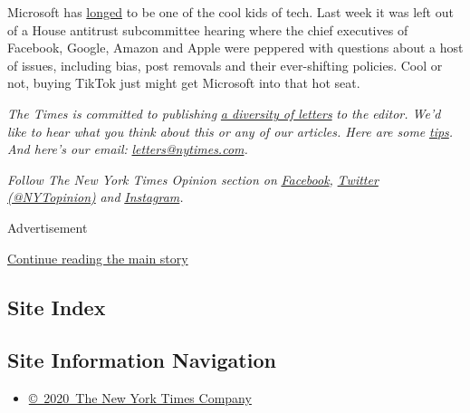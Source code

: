 Microsoft has
\href{https://www.nytimes.com/2020/08/03/technology/tiktok-microsoft-tweens.html}{longed}
to be one of the cool kids of tech. Last week it was left out of a House
antitrust subcommittee hearing where the chief executives of Facebook,
Google, Amazon and Apple were peppered with questions about a host of
issues, including bias, post removals and their ever-shifting policies.
Cool or not, buying TikTok just might get Microsoft into that hot seat.

\emph{The Times is committed to publishing}
\href{https://www.nytimes.com/2019/01/31/opinion/letters/letters-to-editor-new-york-times-women.html}{\emph{a
diversity of letters}} \emph{to the editor. We'd like to hear what you
think about this or any of our articles. Here are some}
\href{https://help.nytimes.com/hc/en-us/articles/115014925288-How-to-submit-a-letter-to-the-editor}{\emph{tips}}\emph{.
And here's our email:}
\href{mailto:letters@nytimes.com}{\emph{letters@nytimes.com}}\emph{.}

\emph{Follow The New York Times Opinion section on}
\href{https://www.facebook.com/nytopinion}{\emph{Facebook}}\emph{,}
\href{http://twitter.com/NYTOpinion}{\emph{Twitter (@NYTopinion)}}
\emph{and}
\href{https://www.instagram.com/nytopinion/}{\emph{Instagram}}\emph{.}

Advertisement

\protect\hyperlink{after-bottom}{Continue reading the main story}

\hypertarget{site-index}{%
\subsection{Site Index}\label{site-index}}

\hypertarget{site-information-navigation}{%
\subsection{Site Information
Navigation}\label{site-information-navigation}}

\begin{itemize}
\tightlist
\item
  \href{https://help.nytimes.com/hc/en-us/articles/115014792127-Copyright-notice}{©~2020~The
  New York Times Company}
\end{itemize}

